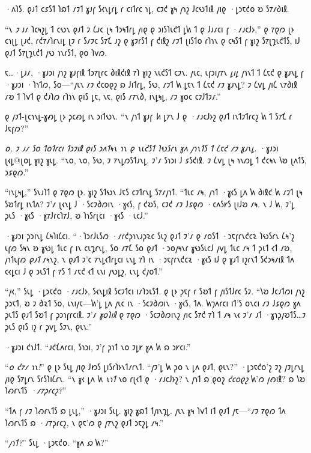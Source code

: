·𐑵𐑐𐑕. 𐑞𐑨𐑑 𐑤𐑭𐑕𐑑 𐑐𐑸𐑑 𐑥𐑲𐑑 𐑣𐑨𐑝 𐑕𐑬𐑯𐑛𐑩𐑛 𐑩 𐑤𐑦𐑑𐑩𐑤 𐑪𐑛, 𐑤𐑲𐑒 𐑣𐑰 𐑢𐑪𐑟 𐑓𐑤𐑻𐑑𐑦𐑙 𐑢𐑦𐑞 ·𐑛𐑮𐑱𐑒𐑴 𐑹 𐑕𐑳𐑥𐑔𐑦𐑙.

“𐑯 \emph{𐑲} 𐑨𐑥 𐑐𐑤𐑰𐑟𐑛 𐑑 𐑤𐑻𐑯 𐑞𐑨𐑑 𐑲 𐑖𐑨𐑤 𐑚𐑰 𐑑𐑮𐑰𐑑𐑩𐑛 𐑢𐑦𐑞 𐑞 𐑮𐑦𐑕𐑐𐑧𐑒𐑑 𐑛𐑿 𐑑 𐑞 𐑓𐑨𐑥𐑤𐑦 𐑝 ·𐑥𐑨𐑤𐑓𐑶,” 𐑞 𐑳𐑞𐑼 𐑚𐑶 𐑤𐑪𐑚𐑛 𐑚𐑨𐑒, 𐑩𐑒𐑳𐑥𐑐𐑩𐑯𐑦𐑛 𐑚𐑲 𐑩 𐑕𐑥𐑲𐑤 𐑕𐑳𐑗 𐑨𐑟 𐑞 𐑣𐑲𐑩𐑕𐑑 𐑝 𐑒𐑦𐑙𐑟 𐑥𐑲𐑑 𐑚𐑦𐑕𐑑𐑴 𐑩𐑐𐑪𐑯 𐑞 𐑤𐑰𐑕𐑑 𐑝 𐑣𐑦𐑟 𐑕𐑳𐑚𐑡𐑧𐑒𐑑𐑕, 𐑦𐑓 𐑞𐑨𐑑 𐑕𐑳𐑚𐑡𐑧𐑒𐑑 𐑢𐑻 𐑪𐑯𐑩𐑕𐑑, 𐑞𐑴 𐑐𐑫𐑼.

𐑱…·𐑛𐑨𐑥, ·𐑣𐑨𐑮𐑦 𐑢𐑪𐑟 𐑣𐑨𐑝𐑦𐑙 𐑑𐑮𐑳𐑚𐑩𐑤 𐑔𐑦𐑙𐑒𐑦𐑙 𐑳𐑐 𐑣𐑦𐑟 𐑯𐑧𐑒𐑕𐑑 𐑤𐑲𐑯. 𐑢𐑧𐑤, 𐑧𐑝𐑮𐑦𐑢𐑳𐑯 \emph{𐑛𐑦𐑛} 𐑢𐑪𐑯𐑑 𐑑 𐑖𐑱𐑒 𐑞 𐑣𐑨𐑯𐑛 𐑝 ·𐑣𐑨𐑮𐑦 ·𐑐𐑪𐑑𐑼, 𐑕𐑴—“𐑢𐑧𐑯 𐑥𐑲 𐑒𐑤𐑴𐑞𐑟 𐑸 𐑓𐑦𐑑𐑩𐑛, 𐑕𐑻, 𐑥𐑲𐑑 𐑿 𐑛𐑱𐑯 𐑑 𐑖𐑱𐑒 𐑥𐑲 𐑣𐑨𐑯𐑛? 𐑲 𐑖𐑫𐑛 𐑢𐑦𐑖 𐑯𐑳𐑔𐑦𐑙 𐑥𐑹 𐑑 𐑐𐑫𐑑 𐑞 𐑒𐑨𐑐𐑼 𐑩𐑐𐑪𐑯 𐑞𐑦𐑕 𐑛𐑱, 𐑯𐑱, 𐑞𐑦𐑕 𐑥𐑳𐑯𐑔, 𐑦𐑯𐑛𐑰𐑛, 𐑥𐑲 𐑣𐑴𐑤 𐑤𐑲𐑓𐑑𐑲𐑥.”

𐑞 𐑢𐑲𐑑-𐑚𐑤𐑪𐑯𐑛-𐑣𐑺𐑛 𐑚𐑶 𐑜𐑤𐑺𐑛 𐑦𐑯 𐑮𐑦𐑑𐑻𐑯. “𐑯 𐑢𐑪𐑑 𐑣𐑨𐑝 \emph{𐑿} 𐑛𐑳𐑯 𐑓 𐑞 ·𐑥𐑨𐑤𐑓𐑶𐑟 𐑞𐑨𐑑 𐑦𐑯𐑑𐑲𐑑𐑩𐑤𐑟 𐑿 𐑑 𐑕𐑳𐑗 𐑩 𐑓𐑱𐑝𐑼?”

\emph{𐑴, 𐑲 𐑨𐑥 𐑕𐑴 𐑑𐑴𐑑𐑩𐑤𐑦 𐑑𐑮𐑲𐑦𐑙 𐑞𐑦𐑕 𐑮𐑵𐑑𐑰𐑯 𐑪𐑯 𐑞 𐑯𐑧𐑒𐑕𐑑 𐑐𐑻𐑕𐑩𐑯 𐑣𐑵 𐑢𐑪𐑯𐑑𐑕 𐑑 𐑖𐑱𐑒 𐑥𐑲 𐑣𐑨𐑯𐑛.} ·𐑣𐑨𐑮𐑦 𐑚𐑬𐑛@𐑚𐑴𐑛 𐑣𐑦𐑟 𐑣𐑧𐑛. “𐑯𐑴, 𐑯𐑴, 𐑕𐑻, 𐑲 𐑳𐑯𐑛𐑼𐑕𐑑𐑨𐑯𐑛. 𐑲'𐑥 𐑕𐑪𐑮𐑦 𐑓 𐑭𐑕𐑒𐑦𐑙. 𐑲 𐑖𐑫𐑛 𐑚𐑰 𐑪𐑯𐑼𐑛 𐑑 𐑒𐑤𐑰𐑯 𐑘𐑹 𐑚𐑵𐑑𐑕, 𐑮𐑭𐑞𐑼.”

“𐑦𐑯𐑛𐑰𐑛,” 𐑕𐑯𐑨𐑐𐑑 𐑞 𐑳𐑞𐑼 𐑚𐑶. 𐑣𐑦𐑟 𐑕𐑑𐑻𐑯 𐑓𐑱𐑕 𐑤𐑲𐑑𐑩𐑯𐑛 𐑕𐑳𐑥𐑢𐑪𐑑. “𐑑𐑧𐑤 𐑥𐑰, 𐑢𐑪𐑑 ·𐑣𐑬𐑕 𐑛𐑵 𐑿 𐑔𐑦𐑙𐑒 𐑿 𐑥𐑲𐑑 𐑚𐑰 𐑕𐑹𐑑𐑩𐑛 𐑦𐑯𐑑𐑵? 𐑲'𐑥 𐑚𐑬𐑯𐑛 𐑓 ·𐑕𐑤𐑲𐑔𐑼𐑦𐑯 ·𐑣𐑬𐑕, 𐑝 𐑒𐑹𐑕, 𐑤𐑲𐑒 𐑥𐑲 𐑓𐑭𐑞𐑼 ·𐑤𐑵𐑕𐑾𐑕 𐑚𐑦𐑓𐑹 𐑥𐑰. 𐑯 𐑓 𐑿, 𐑲'𐑛 𐑜𐑧𐑕 ·𐑣𐑬𐑕 ·𐑣𐑳𐑓𐑩𐑤𐑐𐑳𐑓, 𐑹 𐑐𐑪𐑕𐑩𐑚𐑤𐑦 ·𐑣𐑬𐑕 ·𐑧𐑤𐑓.”

·𐑣𐑨𐑮𐑦 𐑜𐑮𐑦𐑯𐑛 𐑖𐑰𐑐𐑦𐑖𐑤𐑦. “·𐑐𐑮𐑩𐑓𐑧𐑕𐑼 ·𐑥𐑩𐑒𐑜𐑪𐑯𐑨𐑜𐑷𐑤 𐑕𐑧𐑟 𐑞𐑨𐑑 𐑲'𐑥 𐑞 𐑥𐑴𐑕𐑑 ·𐑮𐑱𐑝𐑩𐑯𐑒𐑤𐑷 𐑐𐑻𐑕𐑩𐑯 𐑖𐑰'𐑟 𐑧𐑝𐑼 𐑕𐑰𐑯 𐑹 𐑣𐑻𐑛 𐑑𐑧𐑤 𐑝 𐑦𐑯 𐑤𐑧𐑡𐑩𐑯𐑛, 𐑕𐑴 𐑥𐑳𐑗 𐑕𐑴 𐑞𐑨𐑑 ·𐑮𐑴𐑢𐑰𐑯𐑩 𐑣𐑻𐑕𐑧𐑤𐑓 𐑢𐑫𐑛 𐑑𐑧𐑤 𐑥𐑰 𐑑 𐑜𐑧𐑑 𐑬𐑑 𐑥𐑹, 𐑢𐑪𐑑𐑧𐑝𐑼 \emph{𐑞𐑨𐑑} 𐑥𐑰𐑯𐑟, 𐑯 𐑞𐑨𐑑 𐑲'𐑤 𐑳𐑯𐑛𐑬𐑑𐑩𐑛𐑤𐑦 𐑧𐑯𐑛 𐑳𐑐 𐑦𐑯 ·𐑮𐑱𐑝𐑩𐑯𐑒𐑤𐑷 ·𐑣𐑬𐑕 𐑦𐑓 𐑞 𐑣𐑨𐑑 𐑦𐑟𐑩𐑯𐑑 𐑕𐑒𐑮𐑰𐑥𐑦𐑙 𐑑𐑵 𐑤𐑬𐑛𐑤𐑦 𐑓 𐑞 𐑮𐑧𐑕𐑑 𐑝 𐑳𐑕 𐑑 𐑥𐑱𐑒 𐑬𐑑 𐑧𐑯𐑦 𐑢𐑻𐑛𐑟, 𐑧𐑯𐑛 𐑒𐑢𐑴𐑑.”

“𐑢𐑬,” 𐑕𐑧𐑛 ·𐑛𐑮𐑱𐑒𐑴 ·𐑥𐑨𐑤𐑓𐑶, 𐑕𐑬𐑯𐑛𐑦𐑙 𐑕𐑤𐑲𐑑𐑤𐑦 𐑦𐑥𐑐𐑮𐑧𐑕𐑑. 𐑞 𐑚𐑶 𐑜𐑱𐑝 𐑩 𐑕𐑹𐑑 𐑝 𐑢𐑦𐑕𐑑𐑓𐑩𐑤 𐑕𐑲. “𐑘𐑹 𐑓𐑤𐑨𐑑𐑼𐑦 𐑢𐑪𐑟 𐑜𐑮𐑱𐑑, 𐑹 𐑲 𐑔𐑷𐑑 𐑕𐑴, 𐑧𐑯𐑦𐑢𐑱—𐑿'𐑛 𐑛𐑵 𐑢𐑧𐑤 𐑦𐑯 ·𐑕𐑤𐑲𐑔𐑼𐑦𐑯 ·𐑣𐑬𐑕, 𐑑𐑵. 𐑿𐑠𐑵𐑩𐑤𐑦 𐑦𐑑'𐑕 𐑴𐑯𐑤𐑦 𐑥𐑲 𐑓𐑭𐑞𐑼 𐑣𐑵 𐑜𐑧𐑑𐑕 𐑞𐑨𐑑 𐑕𐑹𐑑 𐑝 𐑜𐑮𐑪𐑝𐑩𐑤𐑦𐑙. 𐑲'𐑥 \emph{𐑣𐑴𐑐𐑦𐑙} 𐑞 𐑳𐑞𐑼 ·𐑕𐑤𐑲𐑔𐑼𐑦𐑯𐑟 𐑢𐑦𐑤 𐑕𐑳𐑒 𐑳𐑐 𐑑 𐑥𐑰 𐑯𐑬 𐑲'𐑥 𐑨𐑑 ·𐑣𐑪𐑜𐑢𐑹𐑑𐑕…𐑲 𐑜𐑧𐑕 𐑞𐑦𐑕 𐑦𐑟 𐑩 𐑜𐑫𐑛 𐑕𐑲𐑯, 𐑞𐑧𐑯.”

·𐑣𐑨𐑮𐑦 𐑒𐑪𐑓𐑑. “𐑨𐑒𐑗𐑵𐑩𐑤𐑦, 𐑕𐑪𐑮𐑦, 𐑲'𐑝 𐑜𐑪𐑑 𐑯𐑴 𐑲𐑛𐑾 𐑣𐑵 𐑿 𐑸 𐑮𐑾𐑤𐑦.”

“\emph{𐑴 𐑒𐑳𐑥 𐑪𐑯!}” 𐑞 𐑚𐑶 𐑕𐑧𐑛 𐑢𐑦𐑞 𐑓𐑽𐑕 𐑛𐑦𐑕𐑩𐑐𐑶𐑯𐑑𐑥𐑩𐑯𐑑. “𐑢𐑲'𐑛 𐑿 𐑜𐑴 𐑯 𐑛𐑵 𐑞𐑨𐑑, 𐑞𐑧𐑯?” ·𐑛𐑮𐑱𐑒𐑴'𐑟 𐑲𐑟 𐑢𐑲𐑛𐑩𐑯𐑛 𐑢𐑦𐑞 𐑕𐑳𐑛𐑩𐑯 𐑕𐑩𐑕𐑐𐑦𐑖𐑩𐑯. “𐑯 𐑣𐑬 𐑛𐑵 𐑿 \emph{𐑯𐑪𐑑} 𐑯𐑴 𐑩𐑚𐑬𐑑 𐑞 ·𐑥𐑨𐑤𐑓𐑶𐑟? 𐑯 𐑢𐑪𐑑 𐑸 𐑞𐑴𐑟 \emph{𐑒𐑤𐑴𐑞𐑟} 𐑿'𐑼 𐑢𐑺𐑦𐑙? 𐑸 𐑘𐑹 𐑐𐑺𐑩𐑯𐑑𐑕 \emph{·𐑥𐑳𐑜𐑩𐑤𐑟?}”

“𐑑𐑵 𐑝 𐑥𐑲 𐑐𐑺𐑩𐑯𐑑𐑕 𐑸 𐑛𐑧𐑛,” ·𐑣𐑨𐑮𐑦 𐑕𐑧𐑛. 𐑣𐑦𐑟 𐑣𐑸𐑑 𐑑𐑢𐑦𐑯𐑡𐑛. 𐑢𐑧𐑯 𐑣𐑰 𐑐𐑫𐑑 𐑦𐑑 𐑞𐑨𐑑 𐑢𐑱—“𐑥𐑲 𐑳𐑞𐑼 𐑑𐑵 𐑐𐑺𐑩𐑯𐑑𐑕 𐑸 ·𐑥𐑳𐑜𐑩𐑤𐑟, 𐑯 𐑞𐑱'𐑼 𐑞 𐑢𐑳𐑯𐑟 𐑞𐑨𐑑 𐑮𐑱𐑟𐑛 𐑥𐑰.”

“\emph{𐑢𐑪𐑑?}” 𐑕𐑧𐑛 ·𐑛𐑮𐑱𐑒𐑴. “𐑣𐑵 \emph{𐑸} 𐑿?”

